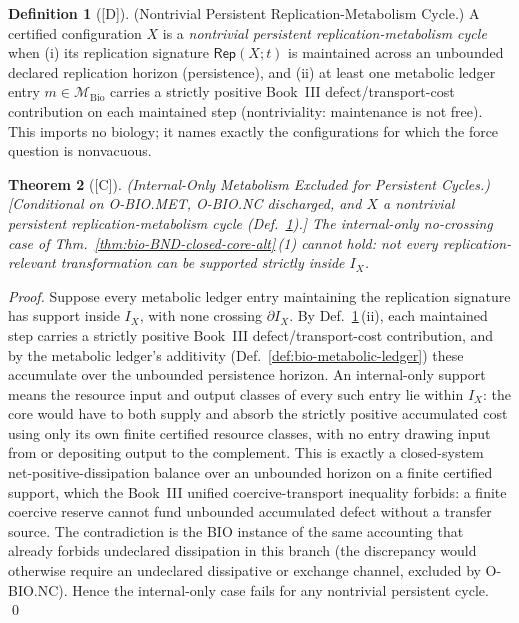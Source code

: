 \documentclass[12pt,oneside]{amsbook}
\theoremstyle{plain}
\newtheorem{theorem}{Theorem}[section]
\theoremstyle{definition}
\newtheorem{definition}[theorem]{Definition}
\theoremstyle{remark}
\newcommand{\status}[1]{\textup{[#1]}}
\begin{document}
\begin{definition}[\status{D}]\label{def:bio-persistent-cycle}
\textup{(Nontrivial Persistent Replication-Metabolism Cycle.)}
A certified configuration $X$ is a \emph{nontrivial persistent
replication-metabolism cycle} when (i) its replication signature
$\mathsf{Rep}(X;t)$ is maintained across an unbounded declared
replication horizon (persistence), and (ii) at least one metabolic
ledger entry $m \in \mathcal{M}_{\mathrm{Bio}}$ carries a strictly
positive Book~III defect/transport-cost contribution on each
maintained step (nontriviality: maintenance is not free).  This
imports no biology; it names exactly the configurations for which
the force question is nonvacuous.
\end{definition}

\begin{theorem}[\status{C}]\label{thm:bio-BND-force-internal-excluded}
\textup{(Internal-Only Metabolism Excluded for Persistent Cycles.)}
\textup{[Conditional on O-BIO.MET, O-BIO.NC discharged, and $X$ a
nontrivial persistent replication-metabolism cycle
(Def.~\ref{def:bio-persistent-cycle}).]}
The internal-only no-crossing case of
Thm.~\ref{thm:bio-BND-closed-core-alt}\,(1) cannot hold: not every
replication-relevant transformation can be supported strictly
inside $I_X$.
\end{theorem}

\begin{proof}
Suppose every metabolic ledger entry maintaining the replication
signature has support inside $I_X$, with none crossing
$\partial I_X$.  By Def.~\ref{def:bio-persistent-cycle}\,(ii),
each maintained step carries a strictly positive Book~III
defect/transport-cost contribution, and by the metabolic ledger's
additivity (Def.~\ref{def:bio-metabolic-ledger}) these accumulate
over the unbounded persistence horizon.  An internal-only support
means the resource input and output classes of every such entry lie
within $I_X$: the core would have to both supply and absorb the
strictly positive accumulated cost using only its own finite
certified resource classes, with no entry drawing input from or
depositing output to the complement.  This is exactly a
closed-system net-positive-dissipation balance over an unbounded
horizon on a finite certified support, which the Book~III unified
coercive-transport inequality forbids: a finite coercive reserve
cannot fund unbounded accumulated defect without a transfer source.
The contradiction is the BIO instance of the same accounting that
already forbids undeclared dissipation in this branch (the
discrepancy would otherwise require an undeclared dissipative or
exchange channel, excluded by O-BIO.NC).  Hence the internal-only
case fails for any nontrivial persistent cycle. \qed
\end{proof}
\end{document}
